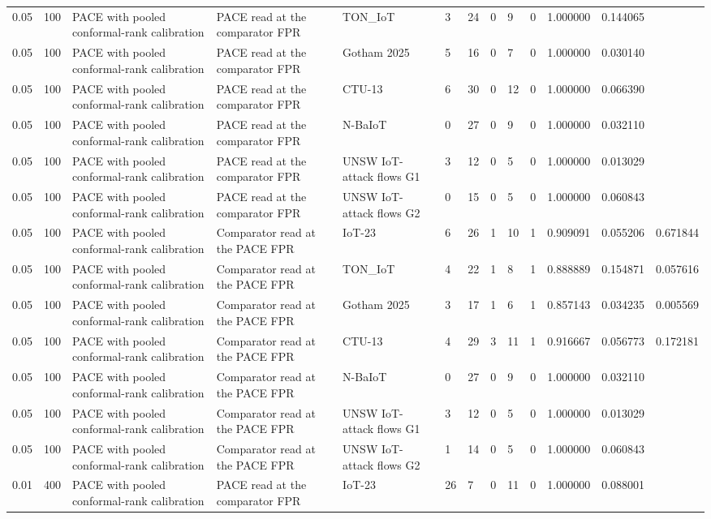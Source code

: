 \begin{tabular}{lllllllllllll}
0.05 & 100 & PACE with pooled conformal-rank calibration & PACE read at the comparator FPR & TON\_IoT & 3 & 24 & 0 & 9 & 0 & 1.000000 & 0.144065 &  \\
0.05 & 100 & PACE with pooled conformal-rank calibration & PACE read at the comparator FPR & Gotham 2025 & 5 & 16 & 0 & 7 & 0 & 1.000000 & 0.030140 &  \\
0.05 & 100 & PACE with pooled conformal-rank calibration & PACE read at the comparator FPR & CTU-13 & 6 & 30 & 0 & 12 & 0 & 1.000000 & 0.066390 &  \\
0.05 & 100 & PACE with pooled conformal-rank calibration & PACE read at the comparator FPR & N-BaIoT & 0 & 27 & 0 & 9 & 0 & 1.000000 & 0.032110 &  \\
0.05 & 100 & PACE with pooled conformal-rank calibration & PACE read at the comparator FPR & UNSW IoT-attack flows G1 & 3 & 12 & 0 & 5 & 0 & 1.000000 & 0.013029 &  \\
0.05 & 100 & PACE with pooled conformal-rank calibration & PACE read at the comparator FPR & UNSW IoT-attack flows G2 & 0 & 15 & 0 & 5 & 0 & 1.000000 & 0.060843 &  \\
0.05 & 100 & PACE with pooled conformal-rank calibration & Comparator read at the PACE FPR & IoT-23 & 6 & 26 & 1 & 10 & 1 & 0.909091 & 0.055206 & 0.671844 \\
0.05 & 100 & PACE with pooled conformal-rank calibration & Comparator read at the PACE FPR & TON\_IoT & 4 & 22 & 1 & 8 & 1 & 0.888889 & 0.154871 & 0.057616 \\
0.05 & 100 & PACE with pooled conformal-rank calibration & Comparator read at the PACE FPR & Gotham 2025 & 3 & 17 & 1 & 6 & 1 & 0.857143 & 0.034235 & 0.005569 \\
0.05 & 100 & PACE with pooled conformal-rank calibration & Comparator read at the PACE FPR & CTU-13 & 4 & 29 & 3 & 11 & 1 & 0.916667 & 0.056773 & 0.172181 \\
0.05 & 100 & PACE with pooled conformal-rank calibration & Comparator read at the PACE FPR & N-BaIoT & 0 & 27 & 0 & 9 & 0 & 1.000000 & 0.032110 &  \\
0.05 & 100 & PACE with pooled conformal-rank calibration & Comparator read at the PACE FPR & UNSW IoT-attack flows G1 & 3 & 12 & 0 & 5 & 0 & 1.000000 & 0.013029 &  \\
0.05 & 100 & PACE with pooled conformal-rank calibration & Comparator read at the PACE FPR & UNSW IoT-attack flows G2 & 1 & 14 & 0 & 5 & 0 & 1.000000 & 0.060843 &  \\
0.01 & 400 & PACE with pooled conformal-rank calibration & PACE read at the comparator FPR & IoT-23 & 26 & 7 & 0 & 11 & 0 & 1.000000 & 0.088001 &  \\

\end{tabular}
